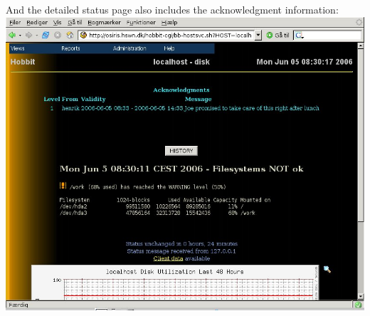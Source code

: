  And the detailed status page also includes the acknowledgment information:\\ 
\includegraphics[scale=1]{./stdview-detail-acked.png} 


